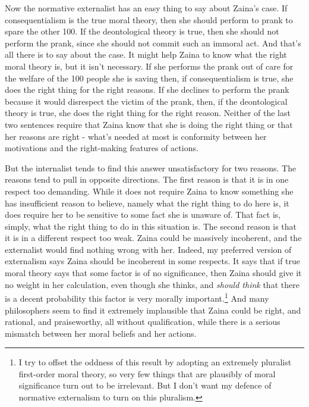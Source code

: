 \documentclass[
  10pt,
  letterpaper,
  twoside]{scrbook}
\begin{document}
Now the normative externalist has an easy thing to say about {Zaina}'s
case. If consequentialism is the true moral theory, then she should
perform to prank to spare the other 100. If the deontological theory is
true, then she should not perform the prank, since she should not commit
such an immoral act. And that's all there is to say about the case. It
might help {Zaina} to know what the right moral theory is, but it isn't
necessary. If she performs the prank out of care for the welfare of the
100 people she is saving then, if consequentialism is true, she does the
right thing for the right reasons. If she declines to perform the prank
because it would disrespect the victim of the prank, then, if the
deontological theory is true, she does the right thing for the right
reason. Neither of the last two sentences require that {Zaina} know that
she is doing the right thing or that her reasons are right - what's
needed at most is conformity between her motivations and the
right-making features of actions.

But the internalist tends to find this answer unsatisfactory for two
reasons. The reasons tend to pull in opposite directions. The first
reason is that it is in one respect too demanding. While it does not
require {Zaina} to know something she has insufficient reason to
believe, namely what the right thing to do here is, it does require her
to be sensitive to some fact she is unaware of. That fact is, simply,
what the right thing to do in this situation is. The second reason is
that it is in a different respect too weak. {Zaina} could be massively
incoherent, and the externalist would find nothing wrong with her.
Indeed, my preferred version of externalism says {Zaina} should be
incoherent in some respects. It says that if true moral theory says that
some factor is of no significance, then {Zaina} should give it no weight
in her calculation, even though she thinks, and \emph{should think} that
there is a decent probability this factor is very morally
important.\footnote{I try to offset the oddness of this result by
  adopting an extremely pluralist first-order moral theory, so very few
  things that are plausibly of moral significance turn out to be
  irrelevant. But I don't want my defence of normative externalism to
  turn on this pluralism.} And many philosophers seem to find it
extremely implausible that {Zaina} could be right, and rational, and
praiseworthy, all without qualification, while there is a serious
mismatch between her moral beliefs and her actions.
\end{document}
